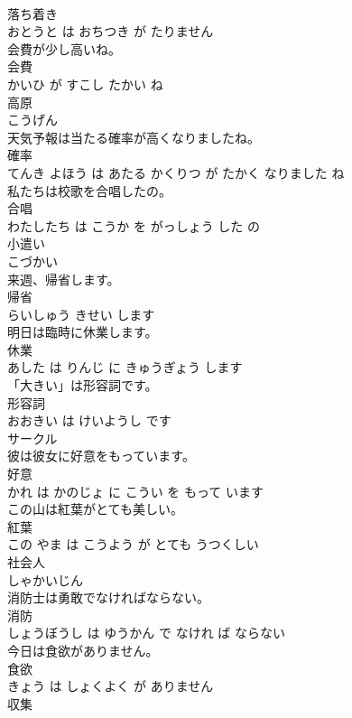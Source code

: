 \documentclass[8pt]{extreport}
\begin{document}
\begin{CJK}{UTF8}{min}
\\	落ち着き 
\\	おとうと は おちつき が たりません			
\\	会費が少し高いね。	
\\	会費 
\\	かいひ が すこし たかい ね			
\\	高原	
\\	こうげん			
\\	天気予報は当たる確率が高くなりましたね。	
\\	確率 
\\	てんき よほう は あたる かくりつ が たかく なりました ね			
\\	私たちは校歌を合唱したの。	
\\	合唱 
\\	わたしたち は こうか を がっしょう した の			
\\	小遣い	
\\	こづかい			
\\	来週、帰省します。	
\\	帰省 
\\	らいしゅう きせい します			
\\	明日は臨時に休業します。	
\\	休業 
\\	あした は りんじ に きゅうぎょう します			
\\	「大きい」は形容詞です。	
\\	形容詞 
\\	おおきい は けいようし です			
\\	サークル	
\\	彼は彼女に好意をもっています。	
\\	好意 
\\	かれ は かのじょ に こうい を もって います			
\\	この山は紅葉がとても美しい。	
\\	紅葉 
\\	この やま は こうよう が とても うつくしい			
\\	社会人	
\\	しゃかいじん			
\\	消防士は勇敢でなければならない。	
\\	消防 
\\	しょうぼうし は ゆうかん で なけれ ば ならない			
\\	今日は食欲がありません。	
\\	食欲 
\\	きょう は しょくよく が ありません			
\\	収集	

\end{CJK}
\end{document}
